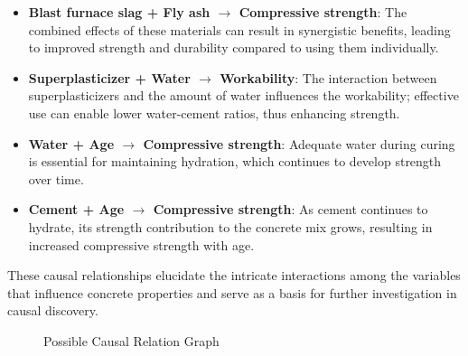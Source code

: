 \documentclass{article}
\begin{document}
\begin{minipage}[t]{0.7\linewidth}
\begin{itemize}
\item \textbf{Blast furnace slag + Fly ash $\rightarrow$ Compressive strength}: The combined effects of these materials can result in synergistic benefits, leading to improved strength and durability compared to using them individually.
\item \textbf{Superplasticizer + Water $\rightarrow$ Workability}: The interaction between superplasticizers and the amount of water influences the workability; effective use can enable lower water-cement ratios, thus enhancing strength.
\item \textbf{Water + Age $\rightarrow$ Compressive strength}: Adequate water during curing is essential for maintaining hydration, which continues to develop strength over time.
\item \textbf{Cement + Age $\rightarrow$ Compressive strength}: As cement continues to hydrate, its strength contribution to the concrete mix grows, resulting in increased compressive strength with age.
\end{itemize}

These causal relationships elucidate the intricate interactions among the variables that influence concrete properties and serve as a basis for further investigation in causal discovery.
\vfill
\end{minipage}
\hspace{0.05\textwidth}
\begin{minipage}[t]{0.3\linewidth}
    \begin{figure}[H]
        \centering
        \vspace{-0.5cm}
        \caption{\label{fig:relation}Possible Causal Relation Graph}
    \end{figure}
\end{minipage}
\end{document}

